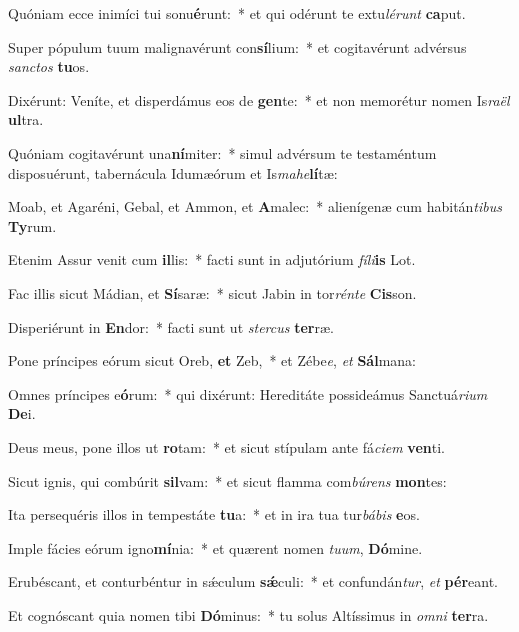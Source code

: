 \item Quóniam ecce inimíci tui sonu\textbf{é}runt:~* et qui odérunt te extu\textit{lé}\textit{runt} \textbf{ca}put.
\item Super pópulum tuum malignavérunt con\textbf{sí}lium:~* et cogitavérunt advérsus \textit{sanc}\textit{tos} \textbf{tu}os.
\item Dixérunt: Veníte, et disperdámus eos de \textbf{gen}te:~* et non memorétur nomen Is\textit{ra}\textit{ël} \textbf{ul}tra.
\item Quóniam cogitavérunt una\textbf{ní}miter:~* simul advérsum te testaméntum disposuérunt, tabernácula Idumæórum et Is\textit{ma}\textit{he}\textbf{lí}tæ:
\item Moab, et Agaréni, Gebal, et Ammon, et \textbf{A}malec:~* alienígenæ cum habitán\textit{ti}\textit{bus} \textbf{Ty}rum.
\item Etenim Assur venit cum \textbf{il}lis:~* facti sunt in adjutórium \textit{fí}\textit{li}\textbf{is} Lot.
\item Fac illis sicut Mádian, et \textbf{Sí}saræ:~* sicut Jabin in tor\textit{rén}\textit{te} \textbf{Cis}son.
\item Disperiérunt in \textbf{En}dor:~* facti sunt ut \textit{ster}\textit{cus} \textbf{ter}ræ.
\item Pone príncipes eórum sicut Oreb, \textbf{et} Zeb,~* et Zébe\textit{e}, \textit{et} \textbf{Sál}mana:
\item Omnes príncipes e\textbf{ó}rum:~* qui dixérunt: Hereditáte possideámus Sanctuá\textit{ri}\textit{um} \textbf{De}i.
\item Deus meus, pone illos ut \textbf{ro}tam:~* et sicut stípulam ante fá\textit{ci}\textit{em} \textbf{ven}ti.
\item Sicut ignis, qui combúrit \textbf{sil}vam:~* et sicut flamma com\textit{bú}\textit{rens} \textbf{mon}tes:
\item Ita persequéris illos in tempestáte \textbf{tu}a:~* et in ira tua tur\textit{bá}\textit{bis} \textbf{e}os.
\item Imple fácies eórum igno\textbf{mí}nia:~* et quærent nomen \textit{tu}\textit{um}, \textbf{Dó}mine.
\item Erubéscant, et conturbéntur in sǽculum \textbf{sǽ}culi:~* et confundán\textit{tur}, \textit{et} \textbf{pér}eant.
\item Et cognóscant quia nomen tibi \textbf{Dó}minus:~* tu solus Altíssimus in \textit{om}\textit{ni} \textbf{ter}ra.
